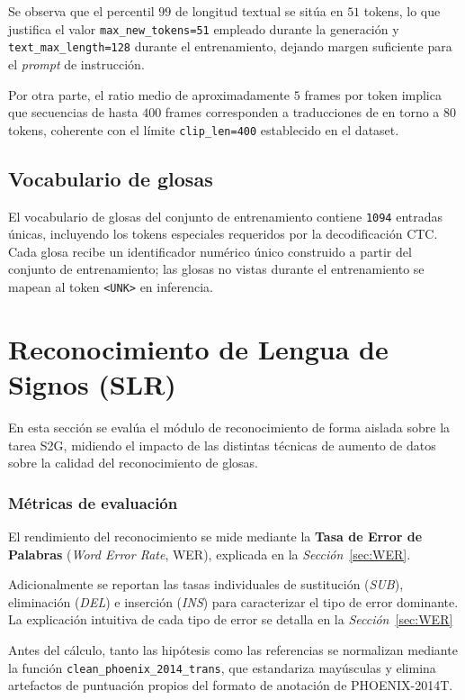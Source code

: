 Se observa que el percentil $99$ de longitud textual se sitúa en $51$ tokens, lo que justifica el valor \texttt{max\_new\_tokens=51} empleado durante la generación y \texttt{text\_max\_length=128} durante el entrenamiento, dejando margen suficiente para el \textit{prompt} de instrucción.

Por otra parte, el ratio medio de aproximadamente $5$ frames por token implica que secuencias de hasta $400$ frames corresponden a traducciones de en torno a $80$ tokens, coherente con el límite \texttt{clip\_len=400} establecido en el dataset.

\subsection{Vocabulario de glosas}
El vocabulario de glosas del conjunto de entrenamiento contiene \texttt{1094} entradas únicas, incluyendo los tokens especiales requeridos por la decodificación CTC.
Cada glosa recibe un identificador numérico único construido a partir del conjunto de entrenamiento; las glosas no vistas durante el entrenamiento se mapean al token \texttt{<UNK>} en inferencia.


\section{Reconocimiento de Lengua de Signos (SLR)}
En esta sección se evalúa el módulo de reconocimiento de forma aislada sobre la tarea S2G, midiendo el impacto de las distintas técnicas de aumento de datos sobre la calidad del reconocimiento de glosas.

\subsubsection{Métricas de evaluación}
El rendimiento del reconocimiento se mide mediante la \textbf{Tasa de Error de Palabras} (\textit{Word Error Rate}, WER), explicada en la \textit{Sección}~\ref{sec:WER}.

Adicionalmente se reportan las tasas individuales de sustitución (\textit{SUB}), eliminación (\textit{DEL}) e inserción (\textit{INS}) para caracterizar el tipo de error dominante.
La explicación intuitiva de cada tipo de error se detalla en la \textit{Sección}~\ref{sec:WER}

Antes del cálculo, tanto las hipótesis como las referencias se normalizan mediante la función \texttt{clean\_phoenix\_2014\_trans}, que estandariza mayúsculas y elimina artefactos de puntuación propios del formato de anotación de PHOENIX-2014T\@.

